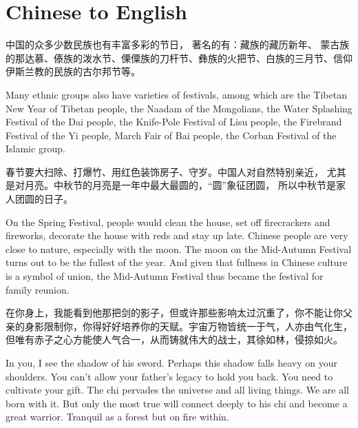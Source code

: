 \section{Chinese to English}

\begin{part}{}{}
    中国的众多少数民族也有丰富多彩的节日， 著名的有：藏族的藏历新年、 蒙古族的那达慕、傣族的泼水节、傈僳族的刀杆节、彝族的火把节、白族的三月节、信仰伊斯兰教的民族的古尔邦节等。

    Many ethnic groups also have varieties of festivals, among which are the Tibetan New Year of Tibetan people, the Naadam of the Mongolians, the Water Splashing Festival of the Dai people, the Knife-Pole Festival of Lisu people, the Firebrand Festival of the Yi people, March Fair of Bai people, the Corban Festival of the Islamic group.
\end{part}

\begin{part}{}{}
    春节要大扫除、打爆竹、用红色装饰房子、守岁。中国人对自然特别亲近， 尤其是对月亮。中秋节的月亮是一年中最大最圆的，“圆”象征团圆， 所以中秋节是家人团圆的日子。

    On the Spring Festival, people would clean the house, set off firecrackers and fireworks, decorate the house with reds and stay up late. Chinese people are very close to nature, especially with the moon. The moon on the Mid-Autumn Festival turns out to be the fullest of the year. And given that fullness in Chinese culture is a symbol of union, the Mid-Autumn Festival thus became the festival for family reunion.
\end{part}

\begin{part}{}{}
    在你身上，我能看到他那把剑的影子，但或许那些影响太过沉重了，你不能让你父亲的身影限制你，你得好好培养你的天赋。宇宙万物皆统一于气，人亦由气化生，但唯有赤子之心方能使人气合一，从而铸就伟大的战士，其徐如林，侵掠如火。

    In you, I see the shadow of his sword. Perhaps this shadow falls heavy on your shoulders. You can't allow your father's legacy to hold you back. You need to cultivate your gift. The chi pervades the universe and all living things. We are all born with it. But only the most true will connect deeply to his chi and become a great warrior. Tranquil as a forest but on fire within.
\end{part}